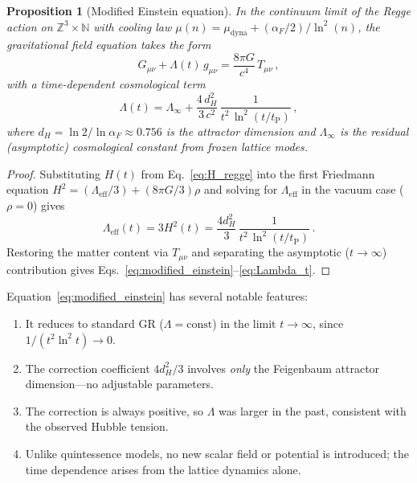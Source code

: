 \documentclass[twocolumn,showpacs,preprintnumbers,amsmath,amssymb,prd]{revtex4-2}
\newtheorem{proposition}{Proposition}
\newcommand{\lnq}{\ln^2}
\newcommand{\tP}{t_{\mathrm{P}}}
\newcommand{\ZZ}{\mathbb{Z}}
\newcommand{\NN}{\mathbb{N}}
\begin{document}
\begin{proposition}[Modified Einstein equation]\label{prop:einstein}
In the continuum limit of the Regge action on
$\ZZ^3 \times \NN$ with cooling law
$\mu(n) = \mu_{\mathrm{dyna}} + (\alpha_F/2)/\lnq(n)$,
the gravitational field equation takes the form
\begin{equation}
  \boxed{G_{\mu\nu} + \Lambda(t)\,g_{\mu\nu}
  = \frac{8\pi G}{c^4}\,T_{\mu\nu}\,,}
  \label{eq:modified_einstein}
\end{equation}
with a time-dependent cosmological term
\begin{equation}
  \Lambda(t) = \Lambda_\infty
  + \frac{4\,d_H^2}{3\,c^2}\,
  \frac{1}{t^2\,\lnq(t/\tP)}\,,
  \label{eq:Lambda_t}
\end{equation}
where $d_H = \ln 2/\ln\alpha_F \approx 0.756$ is the attractor
dimension and $\Lambda_\infty$ is the residual (asymptotic)
cosmological constant from frozen lattice modes.
\end{proposition}

\begin{proof}
Substituting $H(t)$ from Eq.~\eqref{eq:H_regge} into the
first Friedmann equation $H^2 = (\Lambda_{\mathrm{eff}}/3)
+ (8\pi G/3)\rho$ and solving for
$\Lambda_{\mathrm{eff}}$ in the vacuum case ($\rho = 0$) gives
\begin{equation}
  \Lambda_{\mathrm{eff}}(t) = 3H^2(t)
  = \frac{4d_H^2}{3}\,\frac{1}{t^2\,\lnq(t/\tP)}\,.
\end{equation}
Restoring the matter content via $T_{\mu\nu}$ and separating the
asymptotic ($t\to\infty$) contribution gives
Eqs.~\eqref{eq:modified_einstein}--\eqref{eq:Lambda_t}.
\end{proof}

Equation~\eqref{eq:modified_einstein} has several notable features:
\begin{enumerate}
  \item It reduces to standard GR ($\Lambda = \mathrm{const}$)
    in the limit $t \to \infty$, since
    $1/(t^2\lnq t) \to 0$.
  \item The correction coefficient $4d_H^2/3$ involves
    \emph{only} the Feigenbaum attractor dimension---no
    adjustable parameters.
  \item The correction is always positive, so $\Lambda$ was
    larger in the past, consistent with the observed
    Hubble tension.
  \item Unlike quintessence models, no new scalar field or
    potential is introduced; the time dependence arises from
    the lattice dynamics alone.
\end{enumerate}
\end{document}
